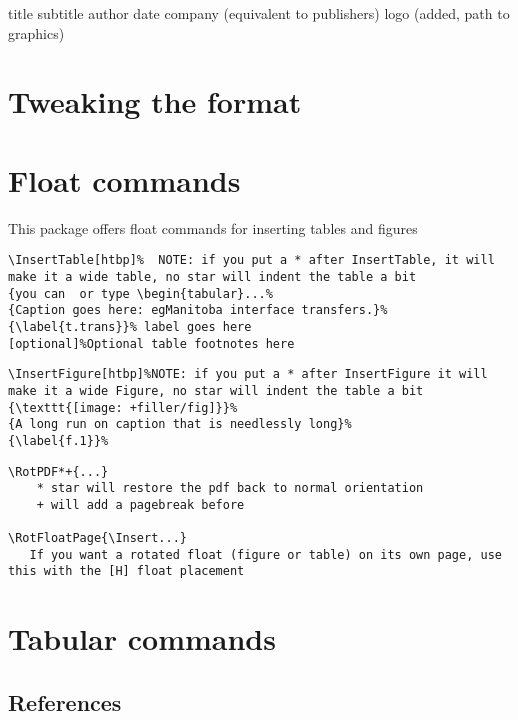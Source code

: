\documentclass{corpboreport}
\begin{document}
title
subtitle
author
date
company (equivalent to publishers)
logo (added, path to graphics)

\section{Tweaking the format}

\section{Float commands}

This package offers float commands for inserting tables and figures

\lstset{language=tex}
\begin{lstlisting}
\InsertTable[htbp]%  NOTE: if you put a * after InsertTable, it will make it a wide table, no star will indent the table a bit
{you can  or type \begin{tabular}...%
{Caption goes here: egManitoba interface transfers.}%
{\label{t.trans}}% label goes here
[optional]%Optional table footnotes here
\end{lstlisting}


\lstset{language=tex}
\begin{lstlisting}
\InsertFigure[htbp]%NOTE: if you put a * after InsertFigure it will make it a wide Figure, no star will indent the table a bit
{\texttt{[image: +filler/fig]}}%
{A long run on caption that is needlessly long}%
{\label{f.1}}%
\end{lstlisting}



\lstset{language=tex}
\begin{lstlisting}
\RotPDF*+{...}
	* star will restore the pdf back to normal orientation
	+ will add a pagebreak before

\RotFloatPage{\Insert...}
   If you want a rotated float (figure or table) on its own page, use this with the [H] float placement
\end{lstlisting}



\section{Tabular commands}

\subsection{References}
\end{document}
